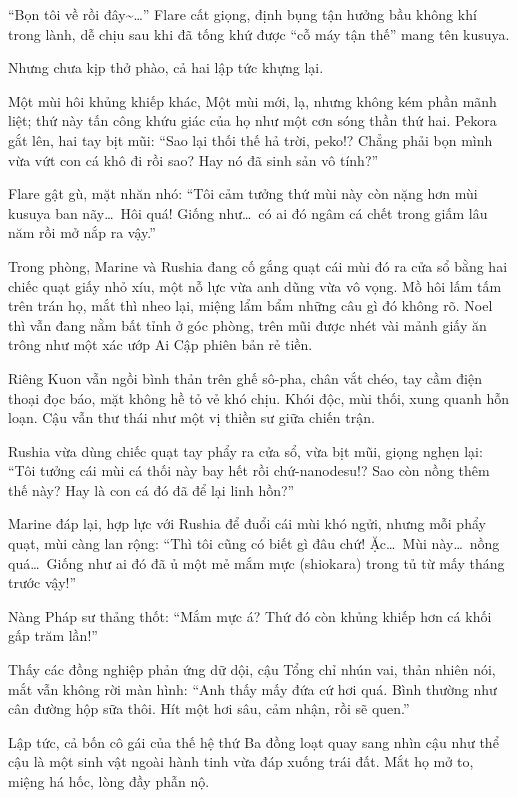 \documentclass[../main.tex]{subfiles}
\begin{document}
``Bọn tôi về rồi đây\~{}\dots'' Flare cất giọng, định bụng tận hưởng bầu không khí trong lành, dễ chịu sau khi đã tống khứ được ``cỗ máy tận thế'' mang tên kusuya.

Nhưng chưa kịp thở phào, cả hai lập tức khựng lại.

Một mùi hôi khủng khiếp khác, Một mùi mới, lạ, nhưng không kém phần mãnh liệt; thứ này tấn công khứu giác của họ như một cơn sóng thần thứ hai. Pekora gắt lên, hai tay bịt mũi: ``Sao lại thối thế hả trời, peko!? Chẳng phải bọn mình vừa vứt con cá khô đi rồi sao? Hay nó đã sinh sản vô tính?''

Flare gật gù, mặt nhăn nhó: ``Tôi cảm tưởng thứ mùi này còn nặng hơn mùi kusuya ban nãy\dots\ Hôi quá! Giống như\dots\ có ai đó ngâm cá chết trong giấm lâu năm rồi mở nắp ra vậy.''

Trong phòng, Marine và Rushia đang cố gắng quạt cái mùi đó ra cửa sổ bằng hai chiếc quạt giấy nhỏ xíu, một nỗ lực vừa anh dũng vừa vô vọng. Mồ hôi lấm tấm trên trán họ, mắt thì nheo lại, miệng lẩm bẩm những câu gì đó không rõ. Noel thì vẫn đang nằm bất tỉnh ở góc phòng, trên mũi được nhét vài mảnh giấy ăn trông như một xác ướp Ai Cập phiên bản rẻ tiền.

Riêng Kuon vẫn ngồi bình thản trên ghế sô-pha, chân vắt chéo, tay cầm điện thoại đọc báo, mặt không hề tỏ vẻ khó chịu. Khói độc, mùi thối, xung quanh hỗn loạn. Cậu vẫn thư thái như một vị thiền sư giữa chiến trận.

Rushia vừa dùng chiếc quạt tay phẩy ra cửa sổ, vừa bịt mũi, giọng nghẹn lại: ``Tôi tưởng cái mùi cá thối này bay hết rồi chứ-nanodesu!? Sao còn nồng thêm thế này? Hay là con cá đó đã để lại linh hồn?''

Marine đáp lại, hợp lực với Rushia để đuổi cái mùi khó ngửi, nhưng mỗi phẩy quạt, mùi càng lan rộng: ``Thì tôi cũng có biết gì đâu chứ! Ặc\dots\ Mùi này\dots\ nồng quá\dots\ Giống như ai đó đã ủ một mẻ mắm mực (shiokara) trong tủ từ mấy tháng trước vậy!''

Nàng Pháp sư thảng thốt: ``Mắm mực á? Thứ đó còn khủng khiếp hơn cá khối gấp trăm lần!''

Thấy các đồng nghiệp phản ứng dữ dội, cậu Tổng chỉ nhún vai, thản nhiên nói, mắt vẫn không rời màn hình: ``Anh thấy mấy đứa cứ hơi quá. Bình thường như cân đường hộp sữa thôi. Hít một hơi sâu, cảm nhận, rồi sẽ quen.''

Lập tức, cả bốn cô gái của thế hệ thứ Ba đồng loạt quay sang nhìn cậu như thể cậu là một sinh vật ngoài hành tinh vừa đáp xuống trái đất. Mắt họ mở to, miệng há hốc, lòng đầy phẫn nộ.
\end{document}
